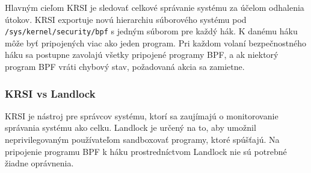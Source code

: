 Hlavným cieľom KRSI je sledovať celkové správanie systému za účelom odhalenia útokov. 
KRSI exportuje novú hierarchiu súborového systému pod \texttt{/sys/kernel/security/bpf} s jedným súborom pre každý hák.
K danému háku môže byť pripojených viac ako jeden program.
Pri každom volaní bezpečnostného háku sa postupne zavolajú všetky pripojené programy BPF, a ak niektorý program BPF vráti chybový stav, požadovaná akcia sa zamietne.

\subsubsection{KRSI vs Landlock} 
KRSI je nástroj pre správcov systému, ktorí sa zaujímajú o monitorovanie správania systému ako celku.
Landlock je určený na to, aby umožnil neprivilegovaným používateľom sandboxovať programy, ktoré spúšťajú.  
Na pripojenie programu BPF k háku prostredníctvom Landlock nie sú potrebné žiadne oprávnenia.















